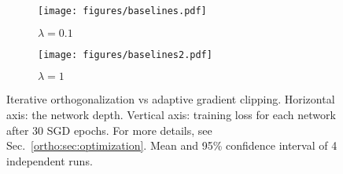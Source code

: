  \begin{figure}[!ht]
      \centering
      \begin{subfigure}[b]{0.3\textwidth}
          \centering        \texttt{[image: figures/baselines.pdf]}
          \caption{$\lambda=0.1$}
          \label{ortho:fig:clipping1}
      \end{subfigure}
      \begin{subfigure}[b]{0.3\textwidth}
          \centering         \texttt{[image: figures/baselines2.pdf]}
      \caption{$\lambda=1$}
  \label{ortho:fig:clipping2}
      \end{subfigure}
         \caption{Iterative orthogonalization vs adaptive gradient clipping. Horizontal axis: the network depth. Vertical axis: training loss for each network after 30 SGD epochs. For more details, see Sec.~\ref{ortho:sec:optimization}.  Mean and 95\% confidence interval of 4 independent runs.}
 \end{figure}


